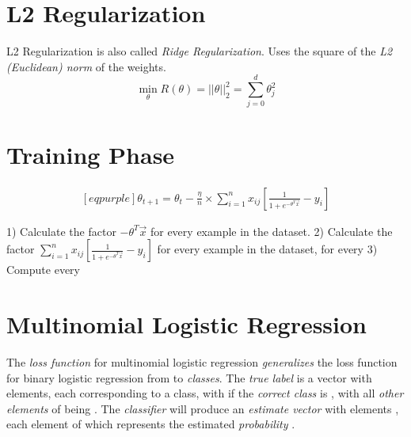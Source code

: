 \documentclass[
	exam={Midterm}
]{cs584exam}
\begin{document}
\section{L2 Regularization}\label{sec:l2-regularization}
L2 Regularization is also called \emph{Ridge Regularization}.
Uses the square of the \emph{L2 (Euclidean) norm} of the weights.
\begin{equation}
	\min_{\theta} R(\theta) = ||\theta||_{2}^{2} = \sum_{j=0}^{d} \theta_{j}^{2}
	\label{eq:l2-regulatization}
\end{equation}

\section{Training Phase}\label{sec:training-phase}
\begin{equation*}
	\begin{aligned}[eqpurple]
		\theta_{t+1} = \theta_{t} - \frac{\eta}{n}\times \sum_{i=1}^{n} x_{ij}\left[ \frac{1}{1 + e^{-\theta^{T}\vec{x}}} - y_{i} \right]
	\end{aligned}
\end{equation*}

1) Calculate the factor $-\theta^{T}\vec{x}$ for every example in the dataset.
2) Calculate the factor $\sum_{i=1}^{n} x_{ij}\left[ \frac{1}{1 + e^{-\theta^{T}\vec{x}}} - y_{i} \right]$ for every example in the dataset, for every \data{$\theta$}
3) Compute every \data{$\theta$}

\section{Multinomial Logistic Regression}\label{sec:multinomial-logistic-regression}
The \emph{loss function} for multinomial logistic regression \emph{generalizes} the loss function for binary logistic regression from  to  \emph{classes}.
The \emph{true label}  is a vector with  elements, each corresponding to a class, with  if the \emph{correct class} is , with all \emph{other elements} of  being .
The \emph{classifier} will produce an \emph{estimate vector} with  elements , each element  of which represents the estimated \emph{probability} .
\end{document}
